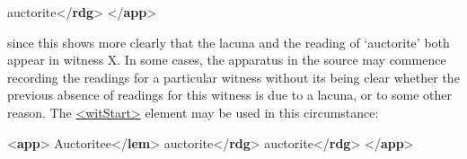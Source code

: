 \begin{shaded}
\hspace*{1em}auctorite{</\textbf{rdg}>}\mbox{}\newline 
{</\textbf{app}>}\end{shaded}\egroup\par \noindent  since this shows more clearly that the lacuna and the reading of ‘auctorite’ both appear in witness X. In some cases, the apparatus in the source may commence recording the readings for a particular witness without its being clear whether the previous absence of readings for this witness is due to a lacuna, or to some other reason. The \hyperref[TEI.witStart]{<witStart>} element may be used in this circumstance: \par\bgroup{}\exampleFont \begin{shaded}\noindent\mbox{}{<\textbf{app}>}\mbox{}\newline 
{}Auctoritee{</\textbf{lem}>}\mbox{}\newline 
{}auctorite{</\textbf{rdg}>}\mbox{}\newline 
{}\mbox{}\newline 
\hspace*{1em}auctorite{</\textbf{rdg}>}\mbox{}\newline 
{</\textbf{app}>}\end{shaded}\egroup\par 
